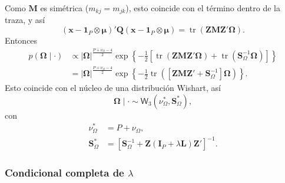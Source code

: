 \documentclass[11pt,a4paper]{article}
\begin{document}
Como $\mathbf{M}$ es simétrica ($m_{kj} = m_{jk}$), esto coincide con el término dentro de la traza, y así
\[
(\boldsymbol{x} - \boldsymbol{1}_P \otimes \boldsymbol{\mu})' \mathbf{Q} (\boldsymbol{x} - \boldsymbol{1}_P \otimes \boldsymbol{\mu}) = \operatorname{tr}\left(\mathbf{Z}\mathbf{M}\mathbf{Z}'\mathbf{\Omega}\right).
\]
Entonces
\begin{align*}
p(\mathbf{\Omega} \mid \cdot)
&\propto |\mathbf{\Omega}|^{\frac{P + \nu_\Omega - 4}{2}} \exp\left\{ -\frac{1}{2}\left[ \operatorname{tr}\left(\mathbf{Z}\mathbf{M}\mathbf{Z}'\mathbf{\Omega}\right) + \operatorname{tr}\left(\mathbf{S}_\Omega^{-1}\mathbf{\Omega}\right) \right] \right\} \\
&= |\mathbf{\Omega}|^{\frac{P + \nu_\Omega - 4}{2}} \exp\left\{ -\frac{1}{2} \operatorname{tr}\left( \left[\mathbf{Z}\mathbf{M}\mathbf{Z}' + \mathbf{S}_\Omega^{-1}\right]\mathbf{\Omega} \right) \right\}.
\end{align*}
Esto coincide con el núcleo de una distribución Wishart, así
\[
\mathbf{\Omega} \mid \cdot \sim \textsf{W}_3\left(\nu_\Omega^{*}, \mathbf{S}_\Omega^{*}\right),
\]
con
\begin{align*}
\nu_\Omega^{*} &= P + \nu_\Omega, \\
\mathbf{S}_\Omega^{*} &= \left[ \mathbf{S}_\Omega^{-1} + \mathbf{Z}(\mathbf{I}_P + \lambda\mathbf{L})\mathbf{Z}' \right]^{-1}.
\end{align*}

\subsubsection*{Condicional completa de $\lambda$}
\end{document}
